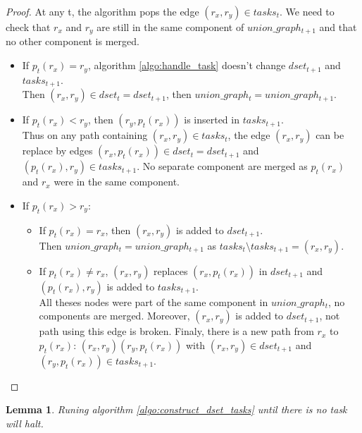 \documentclass[12px]{article}
\newtheorem{lemma}[theorem]{Lemma}
\begin{document}
    \begin{proof}
      At any t, the algorithm pops the edge $(r_x, r_y) \in tasks_t$. We need to check that $r_x$ and $r_y$ are still in the same component of $union\_graph_{t+1}$ and that no other component is merged.
      \begin{itemize}
        \item If $p_t(r_x) = r_y$, algorithm \ref{algo:handle_task} doesn't change $dset_{t+1}$ and $tasks_{t+1}$. \\
          Then $(r_x, r_y) \in dset_t = dset_{t+1}$, then $union\_graph_t = union\_graph_{t+1}$.

        \item If $p_t(r_x) < r_y$, then $(r_y, p_t(r_x))$ is inserted in $tasks_{t+1}$. \\
          Thus on any path containing $(r_x, r_y) \in tasks_t$, the edge $(r_x, r_y)$ can be replace by edges $(r_x, p_t(r_x)) \in dset_t = dset_{t+1}$ and $(p_t(r_x), r_y) \in tasks_{t+1}$. No separate component are merged as $p_t(r_x)$ and $r_x$ were in the same component.

        \item If $p_t(r_x) > r_y$:
        \begin{itemize}
          \item If $p_t(r_x) = r_x$, then $(r_x, r_y)$ is added to $dset_{t+1}$. \\
            Then $union\_graph_t = union\_graph_{t+1}$ as $tasks_t \setminus tasks_{t+1} = {(r_x, r_y)}$.
          \item If $p_t(r_x) \neq r_x$, $(r_x, r_y)$ replaces $(r_x, p_t(r_x))$ in $dset_{t+1}$ and $(p_t(r_x), r_y)$ is added to $tasks_{t+1}$. \\
            All theses nodes were part of the same component in $union\_graph_t$, no components are merged. Moreover, $(r_x, r_y)$ is added to $dset_{t+1}$, not path using this edge is broken. Finaly, there is a new path from $r_x$ to $p_t(r_x)$: $(r_x, r_y)(r_y, p_t(r_x))$ with $(r_x, r_y) \in dset_{t+1}$ and $(r_y, p_t(r_x)) \in tasks_{t+1}$.
        \end{itemize}
      \end{itemize}
    \end{proof}

    \begin{lemma}
      \label{lemma:halt}
      Runing algorithm \ref{algo:construct_dset_tasks} until there is no task will halt.
    \end{lemma}
\end{document}
